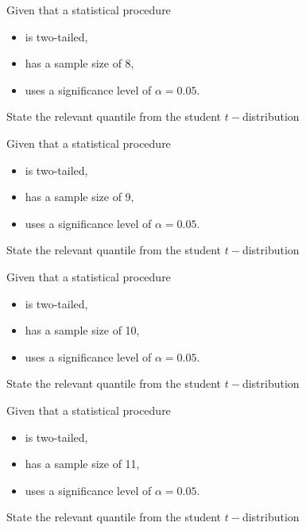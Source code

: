\documentclass[12pt, a4paper]{report}
\author{ } \date{ }
\theoremstyle{definition}
\theoremstyle{remark}
\begin{document}
	
	
	
	Given that a statistical procedure 
	\begin{itemize}
		\item is two-tailed,
		\item has a sample size of 8,
		\item uses a significance level of $\alpha = 0.05$.
	\end{itemize} \smallskip
	State the relevant quantile from the student $t-$distribution
	


	
	
	
	Given that a statistical procedure
	\begin{itemize}
		\item is two-tailed,
		\item has a sample size of 9,
		\item uses a significance level of $\alpha = 0.05$.
	\end{itemize} \smallskip
	State the relevant quantile from the student $t-$distribution
	


	
	
	
	Given that a statistical procedure 
	\begin{itemize}
		\item is two-tailed,
		\item has a sample size of 10,
		\item uses a significance level of $\alpha = 0.05$.
	\end{itemize} \smallskip
	State the relevant quantile from the student $t-$distribution
	


	
	
	
	Given that a statistical procedure 
	\begin{itemize}
		\item is two-tailed,
		\item has a sample size of 11,
		\item uses a significance level of $\alpha = 0.05$.
	\end{itemize} \smallskip
	State the relevant quantile from the student $t-$distribution
	



	
	
\end{document}
